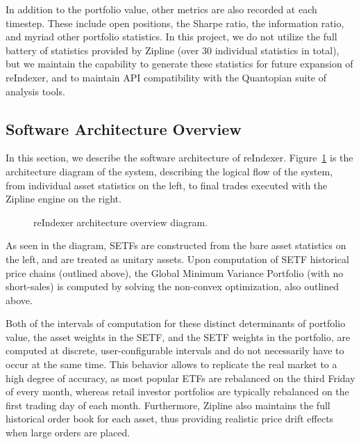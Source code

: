 \documentclass[../main.tex]{subfiles}
\begin{document}
In addition to the portfolio value, other metrics are also recorded at each timestep. These include open positions, the Sharpe ratio, the information ratio, and myriad other portfolio statistics. In this project, we do not utilize the full battery of statistics provided by Zipline (over 30 individual statistics in total), but we maintain the capability to generate these statistics for future expansion of reIndexer, and to maintain API compatibility with the Quantopian suite of analysis tools.

\pagebreak

\subsection{Software Architecture Overview}

In this section, we describe the software architecture of reIndexer. Figure~\ref{fig:candidate_universe_ranking:reindexer_architecture} is the architecture diagram of the system, describing the logical flow of the system, from individual asset statistics on the left, to final trades executed with the Zipline engine on the right.

\begin{figure}[h!]
    \centering
    \caption{reIndexer architecture overview diagram.}
    \label{fig:candidate_universe_ranking:reindexer_architecture}
\end{figure}

As seen in the diagram, SETFs are constructed from the bare asset statistics on the left, and are treated as unitary assets. Upon computation of SETF historical price chains (outlined above), the Global Minimum Variance Portfolio (with no short-sales) is computed by solving the non-convex optimization, also outlined above.

Both of the intervals of computation for these distinct determinants of portfolio value, the asset weights in the SETF, and the SETF weights in the portfolio, are computed at discrete, user-configurable intervals and do not necessarily have to occur at the same time. This behavior allows to replicate the real market to a high degree of accuracy, as most popular ETFs are rebalanced on the third Friday of every month, whereas retail investor portfolios are typically rebalanced on the first trading day of each month. Furthermore, Zipline also maintains the full historical order book for each asset, thus providing realistic price drift effects when large orders are placed.
\end{document}
